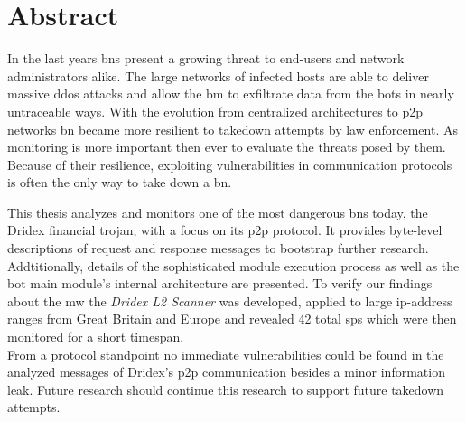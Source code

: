 \chapter*{Abstract}\label{ch:Abstract}

\thispagestyle{empty}

In the last years \glspl{bn} present a growing threat to end-users and network administrators alike.
The large networks of infected hosts are able to deliver massive \gls{ddos} attacks and allow the \gls{bm} to exfiltrate data from the \glspl{bot} in nearly untraceable ways.
With the evolution from centralized architectures to \gls{p2p} networks \gls{bn} became more resilient to takedown attempts by law enforcement.
As monitoring is more important then ever to evaluate the threats posed by them.
Because of their resilience, exploiting vulnerabilities in communication protocols is often the only way to take down a \gls{bn}.

This thesis analyzes and monitors one of the most dangerous \glspl{bn} today, the Dridex financial trojan, with a focus on its \gls{p2p} protocol.
It provides byte-level descriptions of request and response messages to bootstrap further research.
Addtitionally, details of the sophisticated module execution process as well as the bot main module's internal architecture are presented.
To verify our findings about the \gls{mw} the \emph{Dridex L2 Scanner} was developed, applied to large \gls{ip}-address ranges from Great Britain and Europe and revealed 42 total \glspl{sp} which were then monitored for a short timespan.\\
%
From a protocol standpoint no immediate vulnerabilities could be found in the analyzed messages of Dridex's \gls{p2p} communication besides a minor information leak.
Future research should continue this research to support future takedown attempts.
